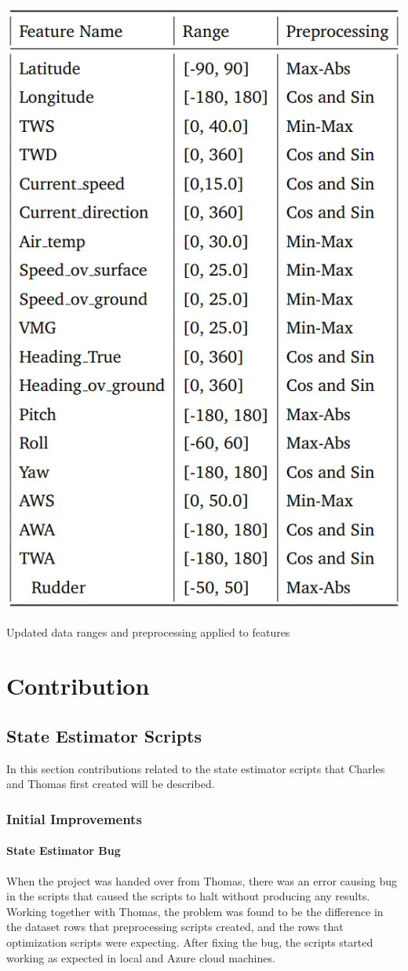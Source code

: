 \documentclass[12pt,twoside]{report}
\begin{document}
\begin{table}[h]
\centering
\includegraphics[width = 0.65\hsize]{figures/data scaling.png}
\caption{Updated data ranges and preprocessing applied to features}
\label{tbl:scripts-scaling}
\end{table}

\chapter{Contribution}

\section{State Estimator Scripts}
In this section contributions related to the state estimator scripts that Charles and Thomas first created will be described.

\subsection{Initial Improvements}

\subsubsection{State Estimator Bug}
When the project was handed over from Thomas, there was an error causing bug in the scripts that caused the scripts to halt without producing any results. Working together with Thomas, the problem was found to be the difference in the dataset rows that preprocessing scripts created, and the rows that optimization scripts were expecting. After fixing the bug, the scripts started working as expected in local and Azure cloud machines.
\end{document}
